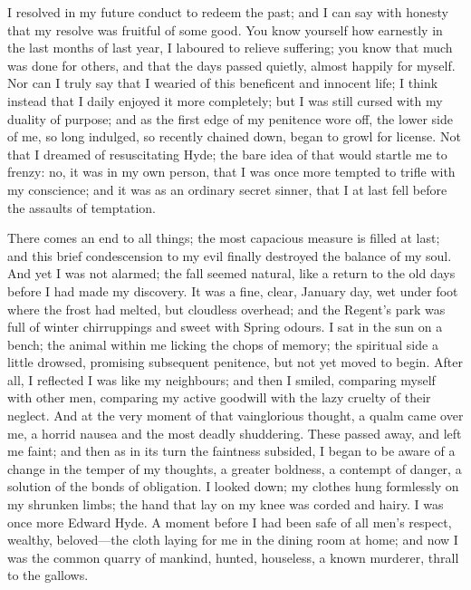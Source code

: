 \documentclass[]{novel}
\begin{document}
I resolved in my future conduct to redeem the past; and I can say with honesty that my resolve was fruitful of some good. You know yourself how earnestly in the last months of last year, I laboured to relieve suffering; you know that much was done for others, and that the days passed quietly, almost happily for myself. Nor can I truly say that I wearied of this beneficent and innocent life; I think instead that I daily enjoyed it more completely; but I was still cursed with my duality of purpose; and as the first edge of my penitence wore off, the lower side of me, so long indulged, so recently chained down, began to growl for license. Not that I dreamed of resuscitating Hyde; the bare idea of that would startle me to frenzy: no, it was in my own person, that I was once more tempted to trifle with my conscience; and it was as an ordinary secret sinner, that I at last fell before the assaults of temptation.

There comes an end to all things; the most capacious measure is filled at last; and this brief condescension to my evil finally destroyed the balance of my soul. And yet I was not alarmed; the fall seemed natural, like a return to the old days before I had made my discovery. It was a fine, clear, January day, wet under foot where the frost had melted, but cloudless overhead; and the Regent's park was full of winter chirruppings and sweet with Spring odours. I sat in the sun on a bench; the animal within me licking the chops of memory; the spiritual side a little drowsed, promising subsequent penitence, but not yet moved to begin. After all, I reflected I was like my neighbours; and then I smiled, comparing myself with other men, comparing my active goodwill with the lazy cruelty of their neglect. And at the very moment of that vainglorious thought, a qualm came over me, a horrid nausea and the most deadly shuddering. These passed away, and left me faint; and then as in its turn the faintness subsided, I began to be aware of a change in the temper of my thoughts, a greater boldness, a contempt of danger, a solution of the bonds of obligation. I looked down; my clothes hung formlessly on my shrunken limbs; the hand that lay on my knee was corded and hairy. I was once more Edward Hyde. A moment before I had been safe of all men's respect, wealthy, beloved—the cloth laying for me in the dining room at home; and now I was the common quarry of mankind, hunted, houseless, a known murderer, thrall to the gallows.
\end{document}
